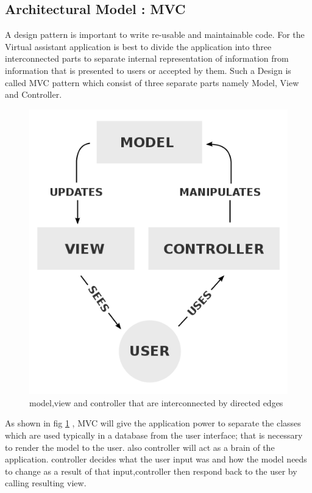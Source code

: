 \subsection{Architectural Model : MVC}
A design pattern is important to write re-usable and maintainable code. For the Virtual assistant application is best to divide the application into three interconnected parts to separate internal representation of information from information that is presented to users or accepted by them\cite{wiki:mvc}. Such a Design is called MVC pattern which consist of three separate parts namely Model, View and Controller.
\begin{figure}[h]
\centering
\includegraphics[scale=0.3]{./img/MVC.PNG}
\caption{\small{model,view and controller that are interconnected by directed edges}}
\label{mvc}
	
\end{figure}

As shown in fig \ref{mvc} , MVC will give the application power to separate the classes which are used typically in a database from the user interface; that is necessary to render the model to the user. also controller will act as a brain of the application. controller decides what the user input was and how the model needs to change as a result of that input\cite{codinghorror},controller then respond back to the user by calling resulting view.

